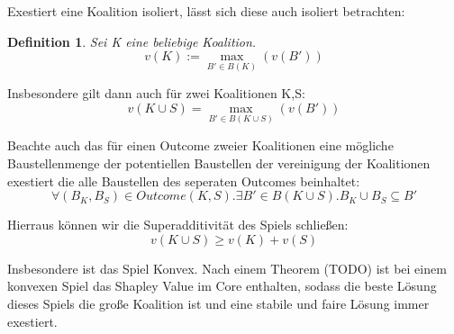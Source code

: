 \documentclass[12pt]{article}
\theoremstyle{break}
\newtheorem{definition}{Definition}
\begin{document}
Exestiert eine Koalition isoliert, lässt sich diese auch isoliert betrachten:
\begin{definition}
  Sei K eine beliebige Koalition.
  \begin{equation}
    v(K) := \max_{B'\in B(K)}(v(B'))
  \end{equation}
\end{definition}

Insbesondere gilt dann auch für zwei Koalitionen K,S:
\begin{equation}
  v(K\cup S) = \max_{B'\in B(K\cup S)}(v(B'))
\end{equation}

Beachte auch das für einen Outcome zweier Koalitionen eine mögliche Baustellenmenge der potentiellen Baustellen der vereinigung der Koalitionen exestiert die alle Baustellen des seperaten Outcomes beinhaltet:
\begin{equation}
  \forall (B_K, B_S)\in Outcome(K,S).\exists B'\in B(K\cup S).B_K\cup B_S\subseteq B'
\end{equation}

Hierraus können wir die Superadditivität des Spiels schließen:
\begin{equation}
  v(K\cup S) \geq v(K) + v(S)
\end{equation}


Insbesondere ist das Spiel Konvex.
Nach einem Theorem (TODO) ist bei einem konvexen Spiel das Shapley Value im Core enthalten, sodass die beste Lösung dieses Spiels die große Koalition ist und eine stabile und faire Lösung immer exestiert.





%
%
%
\end{document}
